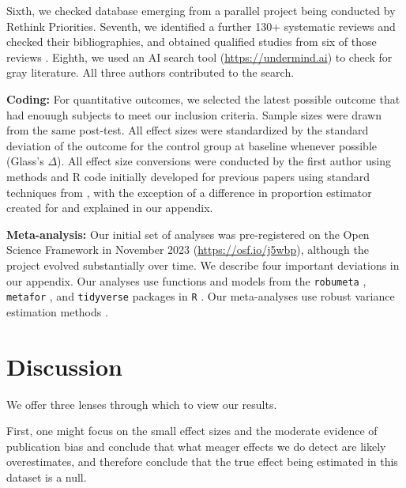 \documentclass[sn-nature,referee,pdflatex]{sn-jnl}
\begin{document}
\begin{comment} 
does this need more description? This is not entirely reproducible I think but TBH it was not a major source of studies in our database
\end{comment}

Sixth, we checked database emerging from a parallel project being
conducted by Rethink Priorities. Seventh, we identified a further 130+
systematic reviews and checked their bibliographies, and obtained
qualified studies from six of those reviews
\citep{ammann2023, chang2023, DiGennaro2024, harguess2020, ronto2022, wynes2018}.
Eighth, we used an AI search tool (\url{https://undermind.ai}) to check
for gray literature. All three authors contributed to the search.

\textbf{Coding:} For quantitative outcomes, we selected the latest
possible outcome that had enouugh subjects to meet our inclusion
criteria. Sample sizes were drawn from the same post-test. All effect
sizes were standardized by the standard deviation of the outcome for the
control group at baseline whenever possible (Glass's \(\Delta\)). All
effect size conversions were conducted by the first author using methods
and R code initially developed for previous papers
\citep{paluck2019, paluck2021, porat2024} using standard techniques from
\citep{cooper2019}, with the exception of a difference in proportion
estimator created for \citep{paluck2021} and explained in our appendix.

\textbf{Meta-analysis:} Our initial set of analyses was pre-registered
on the Open Science Framework in November 2023
(\url{https://osf.io/j5wbp}), although the project evolved substantially
over time. We describe four important deviations in our appendix. Our
analyses use functions and models from the \texttt{robumeta}
\citep{fisher2015}, \texttt{metafor} \citep{viechtbauer2010}, and
\texttt{tidyverse} \citep{wickham2019} packages in \texttt{R}
\citep{Rlang}. Our meta-analyses use robust variance estimation methods
\citep{hedges2010}.

\section{Discussion}\label{Sec4}

We offer three lenses through which to view our results.

First, one might focus on the small effect sizes and the moderate
evidence of publication bias and conclude that what meager effects we do
detect are likely overestimates, and therefore conclude that the true
effect being estimated in this dataset is a null.
\end{document}
